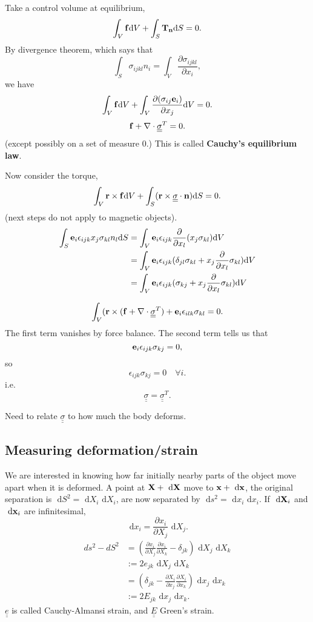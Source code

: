 \documentclass[12pt]{article}
\newcommand{\xx}{{\bf x}}
\newcommand{\ee}{{\bf e}}
\newcommand{\ff}{{\bf f}}
\newcommand{\nn}{{\bf n}}
\newcommand{\rr}{{\bf r}}
\newcommand{\bX}{{\bf X}}
\newcommand{\bT}{{\bf T}}
\newcommand{\ssigma}{{\underline{\underline \sigma}}}
\newcommand{\dV}{{\text{d}V}}
\newcommand{\dS}{{\text{d}S}}
\newcommand{\dx}[1]{\text{ d}#1}
\begin{document}
Take a control volume at equilibrium,
\[
\int_V \ff \dV + \int_S \bT_{\nn}\dS = 0.
\]
By  divergence theorem, which says that
\[
\int_S \sigma_{ijkl}n_i = \int_V \frac{\partial \sigma_{ijkl}}{\partial x_i},
\]
we have
\[
\int_V \ff \dV + \int_V\frac{\partial (\sigma_{ij}\ee_i)}{\partial x_j}\dV = 0.
\]
\[
\ff + \nabla \cdot\ssigma^T = 0.
\]
(except possibly on a set of measure 0.)
This is called {\bf Cauchy's equilibrium law}.

Now consider the torque,
\[
\int_V \rr\times \ff \dV + \int_S (\rr \times \ssigma\cdot \nn)\dS = 0.
\]
(next steps do not apply to magnetic objects).
\begin{align*}
\int_S \ee_i \epsilon_{ijk}x_j\sigma_{kl}n_l\dS &=  \int_V \ee_i \epsilon_{ijk}\frac{\partial}{\partial x_l}(x_j\sigma_{kl}) \dV\\
&= \int_V \ee_i \epsilon_{ijk} ( \delta_{jl}\sigma_{kl} + x_j\frac{\partial}{\partial x_l}\sigma_{kl}) \dV\\
&=  \int_V \ee_i \epsilon_{ijk} ( \sigma_{kj} + x_j\frac{\partial}{\partial x_l}\sigma_{kl})\dV
\end{align*}

\[
\int_V (\rr\times(\ff+\nabla\cdot\ssigma^T) + \ee_i\epsilon_{ilk}\sigma_{kl}=0.
\]
The first term vanishes by force balance. The second term tells us that 
\[
\ee_i \epsilon_{ijk}\sigma_{kj} = 0,
\]
so 
\[
\epsilon_{ijk}\sigma_{kj} = 0 \quad \forall i.
\]
i.e.
\[
\ssigma = \ssigma^T.
\]

Need to relate $\ssigma$ to how much the body deforms.








\subsection{Measuring deformation/strain}
We are interested in knowing how far initially nearby parts of the object move apart when it is deformed.  A point at $\bX + \dx{\bX}$ move to $\xx + \dx{\xx}$, the original separation is $\dx{S}^2 = \dx{X_i}\dx{X_i}$, are now separated by $\dx{s}^2 = \dx{x_i}\dx{x_i}$.
If $\dx{\bX_i}$ and $\dx{\xx_i}$ are infinitesimal,
\[
\dx{x_i}  = \frac{\partial x_i}{\partial X_j} \dx{X_j}.
\]
\begin{align*}
ds^2 - dS^2 &= ( \frac{\partial x_i}{\partial X_j}  \frac{\partial x_i}{\partial X_k}  - \delta_{jk} )\dx{X_j} \dx{X_k} \\
&:=  2 e_{jk} \dx{X_j} \dx{X_k}\\
&= ( \delta_{jk} -  \frac{\partial X_i}{\partial x_j}  \frac{\partial X_i}{\partial x_k} )\dx{x_j}\dx{x_k}\\
&:=  2 E_{jk} \dx{x_j} \dx{x_k}.
\end{align*}
$\underline{\underline e}$ is called Cauchy-Almansi strain, and $\underline{\underline E}$  Green's strain.
\end{document}
